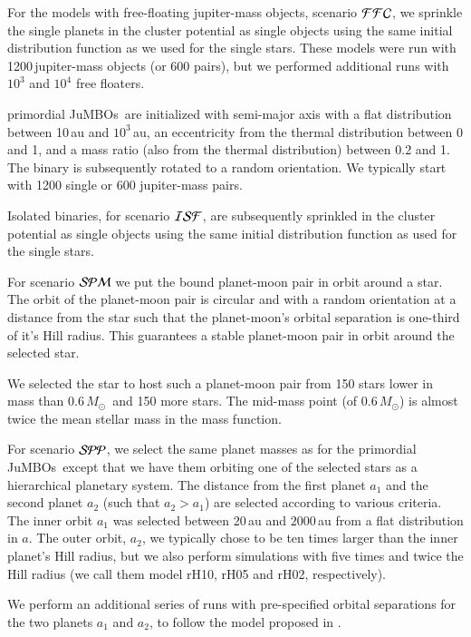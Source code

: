\documentclass[aa]{lib/aa}
\newcommand{\MSun}{\mbox{${M}_\odot$}}
\newcommand{\jumbos}{\mbox{JuMBOs}}
\begin{document}
For the models with free-floating jupiter-mass objects, scenario
${\cal FFC}$, we sprinkle the single planets in the cluster potential
as single objects using the same initial distribution function as we
used for the single stars.  These models were run with
1200\,jupiter-mass objects (or 600 pairs), but we performed additional
runs with $10^3$ and $10^4$ free floaters.

primordial \jumbos\, are initialized with semi-major axis with a flat
distribution between 10\,au and $10^3$\,au, an eccentricity from the
thermal distribution between 0 and 1, and a mass ratio (also from the
thermal distribution) between 0.2 and 1.  The binary is subsequently
rotated to a random orientation. We typically start with 1200 single
or 600 jupiter-mass pairs.

Isolated binaries, for scenario ${\cal ISF}$, are subsequently
sprinkled in the cluster potential as single objects using the same
initial distribution function as used for the single stars.

For scenario ${\cal SPM}$ we put the bound planet-moon pair in orbit
around a star.  The orbit of the planet-moon pair is circular and with
a random orientation at a distance from the star such that the
planet-moon's orbital separation is one-third of it's Hill radius.
This guarantees a stable planet-moon pair in orbit around the selected
star.

We selected the star to host such a planet-moon pair from 150 stars
lower in mass than 0.6\,\MSun\, and 150 more stars. The mid-mass point
(of 0.6\,\MSun) is almost twice the mean stellar mass in the mass
function.

For scenario ${\cal SPP}$, we select the same planet masses as for the
primordial \jumbos\, except that we have them orbiting one of the
selected stars as a hierarchical planetary system. The distance from
the first planet $a_1$ and the second planet $a_2$ (such that
$a_2>a_1$) are selected according to various criteria.  The inner
orbit $a_1$ was selected between 20\,au and $2000$\,au from a flat
distribution in $a$.  The outer orbit, $a_2$, we typically chose to be
ten times larger than the inner planet's Hill radius, but we also
perform simulations with five times and twice the Hill radius (we call
them model rH10, rH05 and rH02, respectively).

We perform an additional series of runs with pre-specified orbital
separations for the two planets $a_1$ and $a_2$, to follow the model
proposed in \cite{2023arXiv231006016W}.
\end{document}
